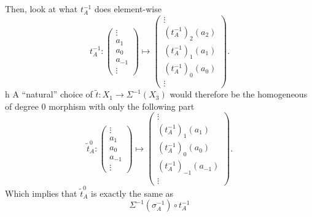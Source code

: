 \begin{question}
    Then, look at what \( t^{-1}_A \) does element-wise
    \[
        t^{-1}_A:
        \begin{pmatrix}
            \vdots \\
            a_1 \\
            a_0 \\
            a_{-1} \\
            \vdots
        \end{pmatrix}
        \mapsto
        \begin{pmatrix}
            \vdots \\
            (t^{-1}_A)_2(a_2) \\
            (t^{-1}_A)_1(a_1) \\
            (t^{-1}_A)_0(a_0) \\
            \vdots
        \end{pmatrix}.
    \]h
    A ``natural'' choice of \( \tilde{t}: X_1 \to \Sigma^{-1}(X_3) \) would therefore be the homogeneous of degree \( 0 \) morphism with only the following part
    \[
        \tilde{t}^0_A:
        \begin{pmatrix}
            \vdots \\
            a_1 \\
            a_0 \\
            a_{-1} \\
            \vdots
        \end{pmatrix}
        \mapsto
        \begin{pmatrix}
            \vdots \\
            (t^{-1}_A)_1(a_1) \\
            (t^{-1}_A)_0(a_0) \\
            (t^{-1}_A)_{-1}(a_{-1}) \\
            \vdots
        \end{pmatrix}.
    \]
    Which implies that \( \tilde{t}_A^0 \) is exactly the same as
    \[
        \Sigma^{-1}(\sigma_A^{-1}) \circ t_A^{-1}
    \]
    


\end{question}
